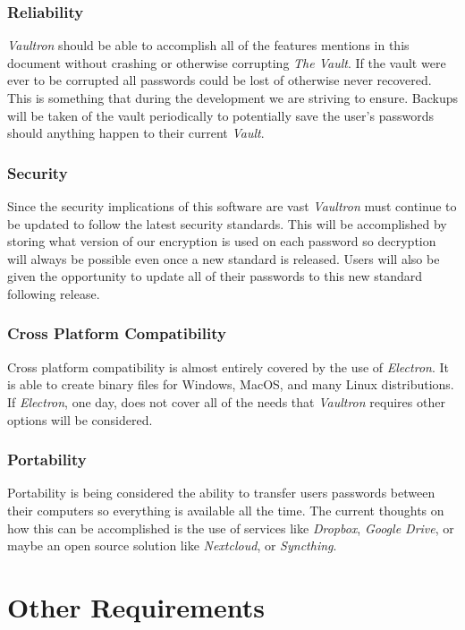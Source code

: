 \documentclass[11pt]{report}
\begin{document}
\subsection{Reliability}
\textit{Vaultron} should be able to accomplish all of the features
mentions in this document without crashing or otherwise corrupting
\textit{The Vault}. If the vault were ever to be corrupted all
passwords could be lost of otherwise never recovered. This is something
that during the development we are striving to ensure. Backups will
be taken of the vault periodically to potentially save the user's
passwords should anything happen to their current \textit{Vault}.

\subsection{Security}
Since the security implications of this software are vast
\textit{Vaultron} must continue to be updated to follow the latest
security standards. This will be accomplished by storing what version
of our encryption is used on each password so decryption will always
be possible even once a new standard is released. Users will also
be given the opportunity to update all of their passwords to this
new standard following release.

\subsection{Cross Platform Compatibility}
Cross platform compatibility is almost entirely covered by the use
of \textit{Electron}. It is able to create binary files for Windows,
MacOS, and many Linux distributions. If \textit{Electron}, one day,
does not cover all of the needs that \textit{Vaultron} requires other
options will be considered. 

\subsection{Portability}
Portability is being considered the ability to transfer users passwords
between their computers so everything is available all the time. The
current thoughts on how this can be accomplished is the use of services
like \textit{Dropbox}, \textit{Google Drive}, or maybe an open source
solution like \textit{Nextcloud}, or \textit{Syncthing}. 




\chapter{Other Requirements}
\end{document}
